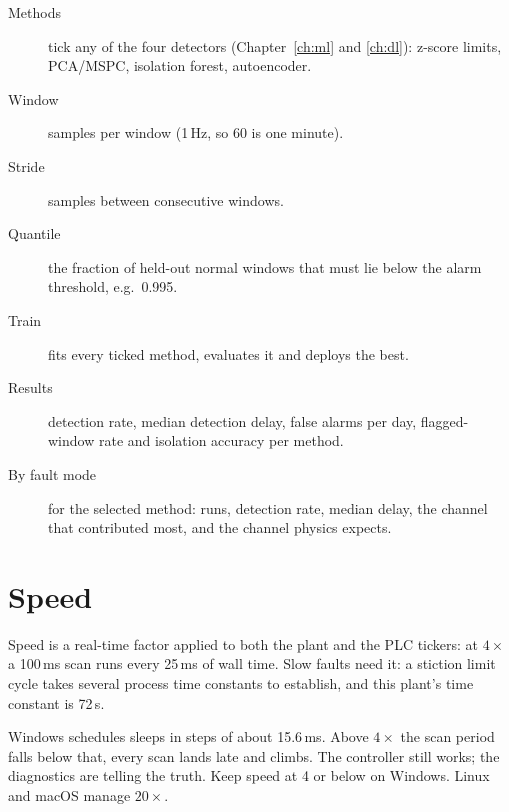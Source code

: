 \begin{description}
  \item[Methods] tick any of the four detectors (Chapter~\ref{ch:ml} and
        \ref{ch:dl}): z-score limits, PCA/MSPC, isolation forest, autoencoder.
  \item[Window] samples per window (1\,Hz, so 60 is one minute).
  \item[Stride] samples between consecutive windows.
  \item[Quantile] the fraction of held-out normal windows that must lie below
        the alarm threshold, e.g.\ 0.995.
  \item[Train] fits every ticked method, evaluates it and deploys the best.
  \item[Results] detection rate, median detection delay, false alarms per
        day, flagged-window rate and isolation accuracy per method.
  \item[By fault mode] for the selected method: runs, detection rate, median
        delay, the channel that contributed most, and the channel physics
        expects.
\end{description}

\section{Speed}
\label{sec:speed}

Speed is a real-time factor applied to both the plant and the PLC tickers:
at $4\times$ a 100\,ms scan runs every 25\,ms of wall time. Slow faults need
it: a stiction limit cycle takes several process time constants to establish,
and this plant's time constant is 72\,s.

\begin{warn}
Windows schedules sleeps in steps of about 15.6\,ms. Above $4\times$ the scan
period falls below that, every scan lands late and  climbs.
The controller still works; the diagnostics are telling the truth. Keep speed
at 4 or below on Windows. Linux and macOS manage $20\times$.
\end{warn}
